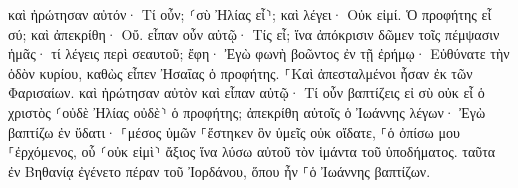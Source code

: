 \documentclass{openreader}
\begin{document}
καὶ ἠρώτησαν αὐτόν· Τί οὖν; ⸂σὺ Ἠλίας εἶ⸃; καὶ λέγει· Οὐκ εἰμί. Ὁ προφήτης εἶ σύ; καὶ ἀπεκρίθη· Οὔ. 
εἶπαν οὖν αὐτῷ· Τίς εἶ; ἵνα ἀπόκρισιν δῶμεν τοῖς πέμψασιν ἡμᾶς· τί λέγεις περὶ σεαυτοῦ; 
ἔφη· Ἐγὼ φωνὴ βοῶντος ἐν τῇ ἐρήμῳ· Εὐθύνατε τὴν ὁδὸν κυρίου, καθὼς εἶπεν Ἠσαΐας ὁ προφήτης. 
⸀Καὶ ἀπεσταλμένοι ἦσαν ἐκ τῶν Φαρισαίων. 
καὶ ἠρώτησαν αὐτὸν καὶ εἶπαν αὐτῷ· Τί οὖν βαπτίζεις εἰ σὺ οὐκ εἶ ὁ χριστὸς ⸂οὐδὲ Ἠλίας οὐδὲ⸃ ὁ προφήτης; 
ἀπεκρίθη αὐτοῖς ὁ Ἰωάννης λέγων· Ἐγὼ βαπτίζω ἐν ὕδατι· ⸀μέσος ὑμῶν ⸀ἕστηκεν ὃν ὑμεῖς οὐκ οἴδατε, 
⸀ὁ ὀπίσω μου ⸀ἐρχόμενος, οὗ ⸂οὐκ εἰμὶ⸃ ἄξιος ἵνα λύσω αὐτοῦ τὸν ἱμάντα τοῦ ὑποδήματος. 
ταῦτα ἐν Βηθανίᾳ ἐγένετο πέραν τοῦ Ἰορδάνου, ὅπου ἦν ⸀ὁ Ἰωάννης βαπτίζων. 
\end{document}
